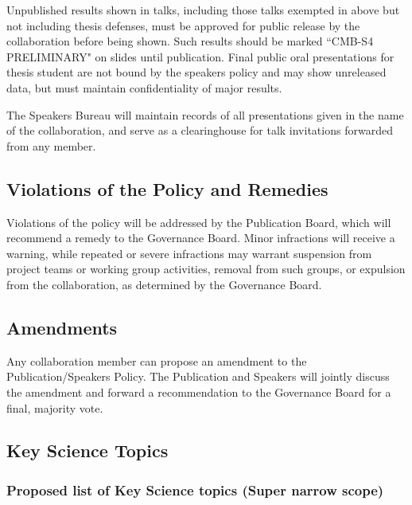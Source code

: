 Unpublished results shown in talks, including those talks exempted in above but not including thesis defenses, must be approved for public release by the collaboration before being shown. Such results should be marked ``CMB-S4 PRELIMINARY" on slides until publication.  Final public oral presentations for thesis student are not bound by the speakers policy and may show unreleased data, but must maintain confidentiality of major results.

The Speakers Bureau will maintain records of all presentations given in the name of the collaboration, and serve as a clearinghouse for talk invitations forwarded from any member.  

\subsection{Violations of the Policy and Remedies}
Violations of the policy will be addressed by the Publication Board, which will recommend a remedy to the Governance Board.  Minor infractions will receive a warning, while repeated or severe infractions may warrant suspension from project teams or working group activities, removal from such groups, or expulsion from the collaboration, as determined by the Governance Board.

\subsection{Amendments}
Any collaboration member can propose an amendment to the Publication/Speakers Policy. The Publication and Speakers will jointly discuss the amendment and forward a recommendation to the Governance Board for a final, majority vote.









\subsection{Key Science Topics}

\subsubsection{Proposed list of Key Science topics (Super narrow scope)}


